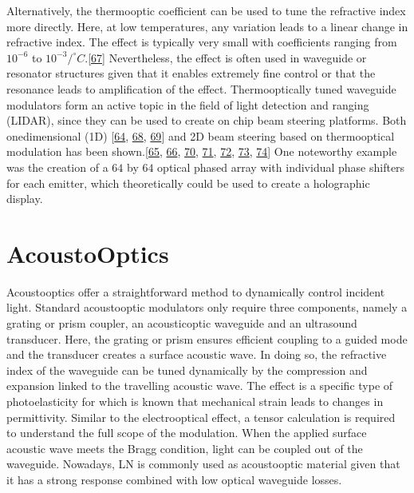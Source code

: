 \documentclass[a4paper,10pt,english,openany,oneside]{jupyterBook}
\begin{document}
\sphinxAtStartPar
Alternatively, the thermo\sphinxhyphen{}optic coefficient can be used to tune the refractive index more directly. Here, at low temperatures, any variation leads to a linear change in refractive index. The effect is typically very small with coefficients ranging from \(10^{-6}\) to \(10^{-3} /^{\circ}C\).{[}\hyperlink{cite.bib:id438}{67}{]} Nevertheless, the effect is often used in waveguide or resonator structures given that it enables extremely fine control or that the resonance leads to amplification of the effect. Thermo\sphinxhyphen{}optically tuned waveguide modulators form an active topic in the field of light detection and ranging (LIDAR), since they can be used to create on chip beam steering platforms. Both one\sphinxhyphen{}dimensional (1D) {[}\hyperlink{cite.bib:id330}{64}, \hyperlink{cite.bib:id241}{68}, \hyperlink{cite.bib:id131}{69}{]} and 2D beam steering based on thermo\sphinxhyphen{}optical modulation has been shown.{[}\hyperlink{cite.bib:id258}{65}, \hyperlink{cite.bib:id496}{66}, \hyperlink{cite.bib:id466}{70}, \hyperlink{cite.bib:id463}{71}, \hyperlink{cite.bib:id439}{72}, \hyperlink{cite.bib:id263}{73}, \hyperlink{cite.bib:id264}{74}{]} One noteworthy example was the creation of a \(64\) by \(64\) optical phased array with individual phase shifters for each emitter, which theoretically could be used to create a holographic display.


\section{Acousto\sphinxhyphen{}Optics}
\label{\detokenize{sota:acousto-optics}}
\sphinxAtStartPar
Acousto\sphinxhyphen{}optics offer a straightforward method to dynamically control incident light. Standard acousto\sphinxhyphen{}optic modulators only require three components, namely a grating or prism coupler, an acoustic\sphinxhyphen{}optic waveguide and an ultrasound transducer. Here, the grating or prism ensures efficient coupling to a guided mode and the transducer creates a surface acoustic wave. In doing so, the refractive index of the waveguide can be tuned dynamically by the compression and expansion linked to the travelling acoustic wave.  The effect is a specific type of photo\sphinxhyphen{}elasticity for which is known that mechanical strain leads to changes in permittivity. Similar to the electro\sphinxhyphen{}optical effect, a tensor calculation is required to understand the full scope of the modulation. When the applied surface acoustic wave meets the Bragg condition, light can be coupled out of the waveguide. Nowadays, LN is commonly used as acousto\sphinxhyphen{}optic material given that it has a strong response combined with low optical waveguide losses.
\end{document}
